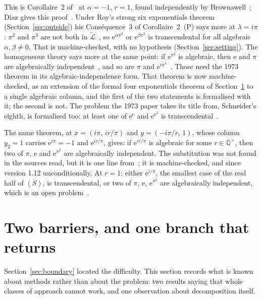 \documentclass[11pt,a4paper]{article}
\theoremstyle{plain}
\theoremstyle{definition}
\newcommand{\e}{\mathrm{e}}
\newcommand{\Q}{\mathbb{Q}}
\newcommand{\aLogs}{\widetilde{\mathcal{L}}}
\begin{document}
This is Corollaire~2 of~\cite{waldschmidt-1973} at $\alpha=-1$, $r=1$, found independently by
Brownawell~\cite{brownawell-1974}; Diaz gives this proof~\cite[p.~386]{diaz-2007}. Under Roy's strong
six exponentials theorem (Section~\ref{sec:outside}) his Cons\'equence~3 of Corollaire~2~(P) says
more at $\lambda=i\pi$: $\pi^{2}$ and $\pi^{3}$ are not both in $\aLogs$~\cite[p.~381]{diaz-2007},
so $\e^{\alpha\pi^{2}}$ or $\e^{\beta\pi^{3}}$ is transcendental for all algebraic
$\alpha,\beta\neq0$. That is machine-checked, with no hypothesis
(Section~\ref{sec:setting}). The homogeneous
theory says more at the same point: if $\e^{\pi^{2}}$ is algebraic, then $\e$ and $\pi$ are
algebraically independent~\cite[Corollaire~1]{waldschmidt-1973}, and so are $\pi$ and
$\e^{i\pi^{3}}$~\cite[Exercise~15.15(c)]{waldschmidt-book}. Those need the 1973 theorem in its
algebraic-independence form. That theorem is now machine-checked, as an extension of the formal
four exponentials theorem of Section~\ref{sec:map} to a single algebraic column, and the first of
the two statements is formalised with it; the second is not. The problem the 1973 paper takes its
title from, Schneider's eighth, is formalised too: at least one of $\e^{\e}$ and $\e^{\e^{2}}$ is
transcendental~\cite[p.~192]{waldschmidt-1973}.

The same theorem, at $x=(i\pi,\,ir/\pi)$ and $y=(-i\pi/r,\,1)$, whose column $y_{2}=1$ carries
$\e^{i\pi}=-1$ and $\e^{ir/\pi}$, gives: if $\e^{ir/\pi}$ is algebraic for some $r\in\Q^{\times}$, then
two of $\pi$, $\e$ and $\e^{\pi^{2}}$ are algebraically independent. The substitution was not found in
the sources read, but it is one line from~\cite[Exercise~15.15(e)]{waldschmidt-book}; it is
machine-checked, and since version 1.12 unconditionally. At $r=1$: either $\e^{i/\pi}$, the smallest case of
the real half of $(S)$, is transcendental, or two of $\pi$, $\e$, $\e^{\pi^{2}}$ are algebraically
independent, which is an open problem~\cite[\S15.3.5]{waldschmidt-book}.



\section{Two barriers, and one branch that returns}\label{sec:map}

Section~\ref{sec:boundary} located the difficulty. This section records what is known about
methods rather than about the problem: two results saying that whole classes of approach cannot
work, and one observation about decomposition itself.
\end{document}
